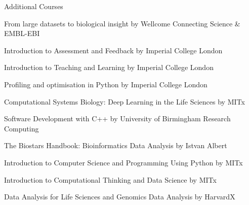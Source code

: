 \documentclass{resume}
\begin{document}
\begin{rSection}{Additional Courses}

\item From large datasets to biological insight by Wellcome Connecting Science \& EMBL-EBI
\vspace{2pt plus 1pt minus 1pt}

\item Introduction to Assessment and Feedback by Imperial College London
\vspace{2pt plus 1pt minus 1pt}

\item Introduction to Teaching and Learning by Imperial College London
\vspace{2pt plus 1pt minus 1pt}

\item Profiling and optimisation in Python by Imperial College London
\vspace{2pt plus 1pt minus 1pt}

\item Computational Systems Biology: Deep Learning in the Life Sciences by MITx
\vspace{2pt plus 1pt minus 1pt}

\item Software Development with C++ by University of Birmingham Research Computing
\vspace{2pt plus 1pt minus 1pt}

\item The Biostars Handbook: Bioinformatics Data Analysis by Istvan Albert
\vspace{2pt plus 1pt minus 1pt}

\item Introduction to Computer Science and Programming Using Python by MITx
\vspace{2pt plus 1pt minus 1pt}

\item Introduction to Computational Thinking and Data Science by MITx
\vspace{2pt plus 1pt minus 1pt}

\item Data Analysis for Life Sciences and Genomics Data Analysis by HarvardX


\end{rSection}
\end{document}
